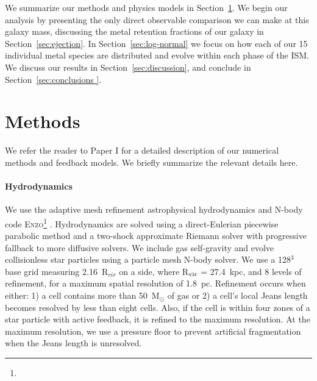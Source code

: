 \documentclass[twocolumn]{aastex61}
\begin{document}
We summarize our methods and physics models in Section~\ref{sec:methods}. We begin our analysis by presenting the only direct observable comparison we can make at this galaxy mass, discussing the metal retention fractions of our galaxy in Section~\ref{sec:ejection}. In Section~\ref{sec:log-normal} we focus on how each of our 15 individual metal species are distributed and evolve within each phase of the ISM. 
   We discuss our results in Section~\ref{sec:discussion}, and conclude in 
   Section~\ref{sec:conclusions  }.

\section{Methods}
\label{sec:methods}
We refer the reader to Paper I for a detailed description of our numerical methods and feedback models. We briefly summarize the relevant details here.

\paragraph{Hydrodynamics} We use the adaptive mesh refinement astrophysical hydrodynamics and N-body code \textsc{Enzo}\footnote{} \citep{Enzo2014}. Hydrodynamics are solved using a direct-Eulerian piecewise parabolic method and a two-shock approximate Riemann solver with progressive fallback to more diffusive solvers. We include gas self-gravity and evolve collisionless star particles using a particle mesh N-body solver. We use a 128$^{3}$ base grid measuring 2.16~R$_{vir}$ on a side, where R$_{\rm vir}$ = 27.4~kpc, and 8 levels of refinement, for a maximum spatial resolution of 1.8~pc. Refinement occurs when either: 1) a cell contains more than 50~M$_{\odot}$ of gas 
    or
2) a cell's local Jeans length becomes resolved by less than eight cells. Also, if the cell is within four zones of a star particle with active feedback, it is refined to the maximum resolution. At the maximum resolution, we use a pressure floor to prevent artificial fragmentation when the Jeans length is unresolved.

\end{document}

